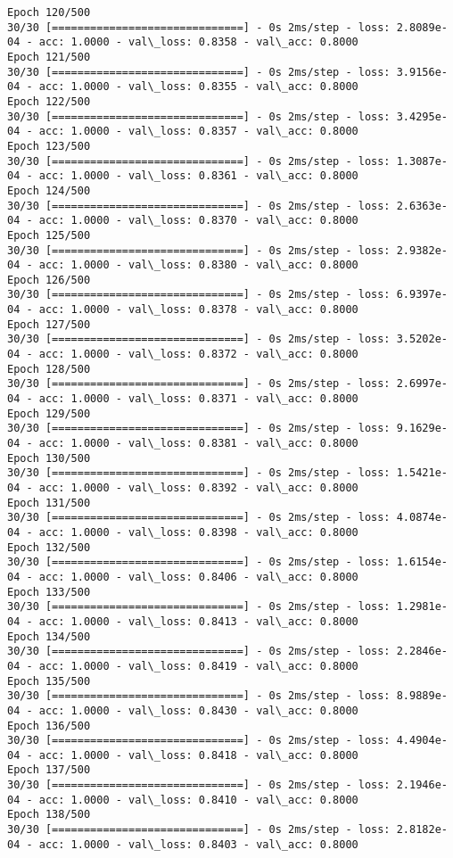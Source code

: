 \documentclass[11pt]{article}
\begin{document}
\begin{Verbatim}[commandchars=\\\{\}]
Epoch 120/500
30/30 [==============================] - 0s 2ms/step - loss: 2.8089e-04 - acc: 1.0000 - val\_loss: 0.8358 - val\_acc: 0.8000
Epoch 121/500
30/30 [==============================] - 0s 2ms/step - loss: 3.9156e-04 - acc: 1.0000 - val\_loss: 0.8355 - val\_acc: 0.8000
Epoch 122/500
30/30 [==============================] - 0s 2ms/step - loss: 3.4295e-04 - acc: 1.0000 - val\_loss: 0.8357 - val\_acc: 0.8000
Epoch 123/500
30/30 [==============================] - 0s 2ms/step - loss: 1.3087e-04 - acc: 1.0000 - val\_loss: 0.8361 - val\_acc: 0.8000
Epoch 124/500
30/30 [==============================] - 0s 2ms/step - loss: 2.6363e-04 - acc: 1.0000 - val\_loss: 0.8370 - val\_acc: 0.8000
Epoch 125/500
30/30 [==============================] - 0s 2ms/step - loss: 2.9382e-04 - acc: 1.0000 - val\_loss: 0.8380 - val\_acc: 0.8000
Epoch 126/500
30/30 [==============================] - 0s 2ms/step - loss: 6.9397e-04 - acc: 1.0000 - val\_loss: 0.8378 - val\_acc: 0.8000
Epoch 127/500
30/30 [==============================] - 0s 2ms/step - loss: 3.5202e-04 - acc: 1.0000 - val\_loss: 0.8372 - val\_acc: 0.8000
Epoch 128/500
30/30 [==============================] - 0s 2ms/step - loss: 2.6997e-04 - acc: 1.0000 - val\_loss: 0.8371 - val\_acc: 0.8000
Epoch 129/500
30/30 [==============================] - 0s 2ms/step - loss: 9.1629e-04 - acc: 1.0000 - val\_loss: 0.8381 - val\_acc: 0.8000
Epoch 130/500
30/30 [==============================] - 0s 2ms/step - loss: 1.5421e-04 - acc: 1.0000 - val\_loss: 0.8392 - val\_acc: 0.8000
Epoch 131/500
30/30 [==============================] - 0s 2ms/step - loss: 4.0874e-04 - acc: 1.0000 - val\_loss: 0.8398 - val\_acc: 0.8000
Epoch 132/500
30/30 [==============================] - 0s 2ms/step - loss: 1.6154e-04 - acc: 1.0000 - val\_loss: 0.8406 - val\_acc: 0.8000
Epoch 133/500
30/30 [==============================] - 0s 2ms/step - loss: 1.2981e-04 - acc: 1.0000 - val\_loss: 0.8413 - val\_acc: 0.8000
Epoch 134/500
30/30 [==============================] - 0s 2ms/step - loss: 2.2846e-04 - acc: 1.0000 - val\_loss: 0.8419 - val\_acc: 0.8000
Epoch 135/500
30/30 [==============================] - 0s 2ms/step - loss: 8.9889e-04 - acc: 1.0000 - val\_loss: 0.8430 - val\_acc: 0.8000
Epoch 136/500
30/30 [==============================] - 0s 2ms/step - loss: 4.4904e-04 - acc: 1.0000 - val\_loss: 0.8418 - val\_acc: 0.8000
Epoch 137/500
30/30 [==============================] - 0s 2ms/step - loss: 2.1946e-04 - acc: 1.0000 - val\_loss: 0.8410 - val\_acc: 0.8000
Epoch 138/500
30/30 [==============================] - 0s 2ms/step - loss: 2.8182e-04 - acc: 1.0000 - val\_loss: 0.8403 - val\_acc: 0.8000

\end{Verbatim}
\end{document}
